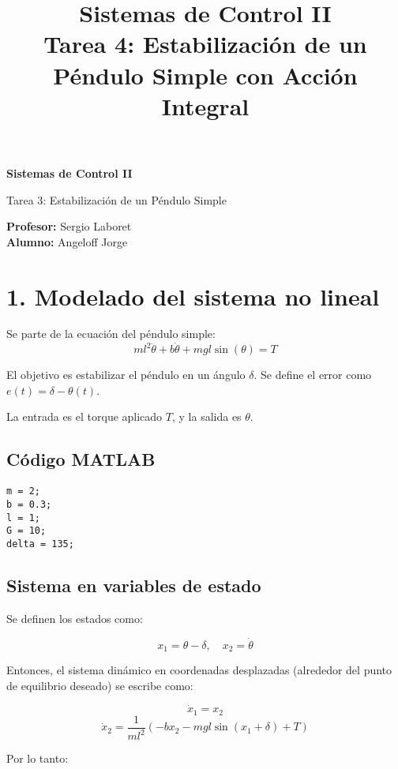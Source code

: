 \documentclass[11pt]{article}
\title{\Huge Sistemas de Control II\\[0.4cm] \Large Tarea 4: Estabilización de un Péndulo Simple con Acción Integral}
\date{}
\begin{document}
\begin{centering}
\vspace*{2cm}
{\Huge\bfseries Sistemas de Control II \par}
\vspace{0.5cm}
{\Large Tarea 3: Estabilización de un Péndulo Simple \par}
\vspace{2cm}
\large
\textbf{Profesor:} Sergio Laboret\\[0.3cm]

\textbf{Alumno:} Angeloff Jorge

\end{centering}
\newpage
\section*{1. Modelado del sistema no lineal}

Se parte de la ecuación del péndulo simple:
\begin{equation}
ml^2 \ddot{\theta} + b \dot{\theta} + mgl \sin(\theta) = T
\end{equation}

El objetivo es estabilizar el péndulo en un ángulo $\delta$. Se define el error como $e(t) = \delta - \theta(t)$.

La entrada es el torque aplicado $T$, y la salida es $\theta$.

\subsection*{Código MATLAB}
\begin{lstlisting}
m = 2;
b = 0.3;
l = 1;
G = 10;
delta = 135;
\end{lstlisting}

\subsection*{Sistema en variables de estado}

Se definen los estados como:

\[
x_1 = \theta - \delta, \quad x_2 = \dot{\theta}
\]

Entonces, el sistema dinámico en coordenadas desplazadas (alrededor del punto de equilibrio deseado) se escribe como:

\[
\dot{x}_1 = x_2
\]
\[
\dot{x}_2 = \frac{1}{ml^2} \left( -b x_2 - mgl \sin(x_1 + \delta) + T \right)
\]

Por lo tanto:
\end{document}
